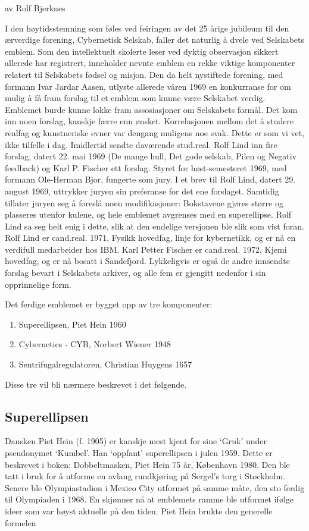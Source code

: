 \documentclass[../main.tex]{subfiles}
\begin{document}
av Rolf Bjerknes

I den høytidsstemning som føles ved feiringen av det 25 årige jubileum til den ærverdige forening, Cybernetisk Selskab, faller det naturlig å dvele ved Selskabets emblem. Som den intellektuelt skolerte leser ved dyktig observasjon sikkert allerede har registrert, inneholder nevnte emblem en rekke viktige komponenter relatert til Selskabets fødsel og misjon. Den da helt nystiftede forening, med formann Ivar Jardar Aasen, utlyste allerede våren 1969 en konkurranse for om mulig å få fram forslag til et emblem som kunne være Selskabet verdig. Emblemet burde kunne lokke fram assosiasjoner om Selskabets formål. Det kom inn noen forslag, kanskje færre enn ønsket. Korrelasjonen mellom det å studere realfag og kunstneriske evner var dengang muligens noe svak. Dette er som vi vet, ikke tilfelle i dag. Imidlertid sendte daværende stud.real. Rolf Lind inn fire forslag, datert 22. mai 1969 (De mange hull, Det gode selskab, Pilen og Negativ feedback) og Karl P. Fischer ett forslag. Styret for høst-semesteret 1969, med formann Ole-Herman Bjor, fungerte som jury. I et brev til Rolf Lind, datert 29. august 1969, uttrykker juryen sin preferanse for det ene forslaget. Samtidig tillater juryen seg å foreslå noen modifikasjoner: Bokstavene gjøres større og plasseres utenfor kulene, og hele emblemet avgrenses med en superellipse. Rolf Lind sa seg helt enig i dette, slik at den endelige versjonen ble slik som vist foran. Rolf Lind er cand.real. 1971, Fysikk hovedfag, linje for kybernetikk, og er nå en verdifull medarbeider hos IBM. Karl Petter Fischer er cand.real. 1972, Kjemi hovedfag, og er nå bosatt i Sandefjord. Lykkeligvis er også de andre innsendte forslag bevart i Selskabets arkiver, og alle fem er gjengitt nedenfor i sin opprinnelige form.

Det ferdige emblemet er bygget opp av tre komponenter:
\begin{enumerate}
\item Superellipsen, Piet Hein 1960
\item Cybernetics - CYB, Norbert Wiener 1948
\item Sentrifugalregulatoren, Christian Huygens 1657
\end{enumerate}
Disse tre vil bli nærmere beskrevet i det følgende.


\subsection{Superellipsen}
Dansken Piet Hein (f. 1905) er kanskje mest kjent for sine `Gruk' under pseudonymet `Kumbel'. Han `oppfant' superellipsen i julen 1959. Dette er beskrevet i boken: Dobbeltmasken, Piet Hein 75 år, København 1980. Den ble tatt i bruk for å utforme en avlang rundkjøring på Sergel's torg i Stockholm. Senere ble Olympiastadion i Mexico City utformet på samme måte, den sto ferdig til Olympiaden i 1968. En skjønner nå at emblemets ramme ble utformet ifølge ideer som var høyst aktuelle på den tiden. Piet Hein brukte den generelle formelen
\end{document}
